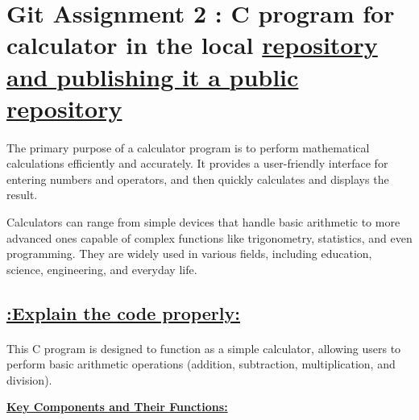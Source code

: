 \documentclass[a4paper,12pt]{article}
\begin{document}
\section*{\large{Git Assignment 2 : C program for calculator in the local
{\underline{repository and publishing it a public repository}}}}
\paragraph{}
The primary purpose of a calculator program is to perform mathematical calculations efficiently and accurately. It provides a user-friendly interface for entering numbers and operators, and then quickly calculates and displays the result. 

Calculators can range from simple devices that handle basic arithmetic to more advanced ones capable of complex functions like trigonometry, statistics, and even programming. They are widely used in various fields, including education, science, engineering, and everyday life.

\begin{center}
\section*{\underline{{:Explain the code properly:}}}
\end{center}

\paragraph{}
This C program is designed to function as a simple calculator, allowing users to perform basic arithmetic operations (addition, subtraction, multiplication, and division).\\

\begin{flushleft}
\underline{\textbf{Key Components and Their Functions:}}\\
\end{flushleft}
\end{document}
